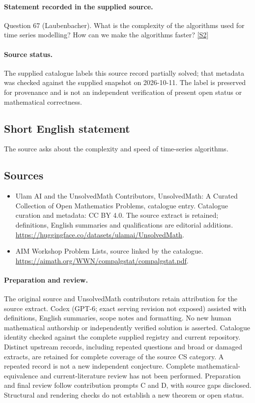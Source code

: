 \documentclass[11pt]{article}
\begin{document}
\paragraph{Statement recorded in the supplied source.}
Question 67 (Laubenbacher). What is the complexity of the algorithms used for time series modelling? How can we make the algorithms faster? \href{https://aimath.org/WWN/compalgstat/compalgstat.pdf}{[S2]}
\paragraph{Source status.}
The supplied catalogue labels this source record partially solved; that metadata was checked against the supplied snapshot on 2026-10-11. The label is preserved for provenance and is not an independent verification of present open status or mathematical correctness.
\subsection{Short English statement}
The source asks about the complexity and speed of time-series algorithms.
\subsection{Sources}
\begin{itemize}
\item[S1] Ulam AI and the UnsolvedMath Contributors, UnsolvedMath: A Curated Collection of Open Mathematics Problems, catalogue entry. Catalogue curation and metadata: CC BY 4.0. The source extract is retained; definitions, English summaries and qualifications are editorial additions.
\url{https://huggingface.co/datasets/ulamai/UnsolvedMath}.
\item[S2] AIM Workshop Problem Lists, source linked by the catalogue.
\url{https://aimath.org/WWN/compalgstat/compalgstat.pdf}.
\end{itemize}
\paragraph{Preparation and review.}
The original source and UnsolvedMath contributors retain attribution for the source extract. Codex (GPT-6; exact serving revision not exposed) assisted with definitions, English summaries, scope notes and formatting. No new human mathematical authorship or independently verified solution is asserted. Catalogue identity checked against the complete supplied registry and current repository. Distinct upstream records, including repeated questions and broad or damaged extracts, are retained for complete coverage of the source CS category. A repeated record is not a new independent conjecture. Complete mathematical-equivalence and current-literature review has not been performed. Preparation and final review follow contribution prompts C and D, with source gaps disclosed. Structural and rendering checks do not establish a new theorem or open status.
\label{end:statement}
\end{document}
